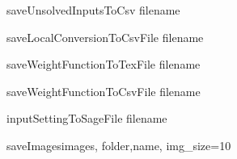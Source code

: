 \begin{method}{saveUnsolvedInputsToCsv}{ filename}

\end{method}


\begin{method}{saveLocalConversionToCsvFile}{ filename}

\end{method}


\begin{method}{saveWeightFunctionToTexFile}{ filename}

\end{method}


\begin{method}{saveWeightFunctionToCsvFile}{ filename}

\end{method}


\begin{method}{inputSettingToSageFile}{ filename}

\end{method}


\begin{method}{saveImages}{images, folder,name, img\_size=10}

\end{method}

